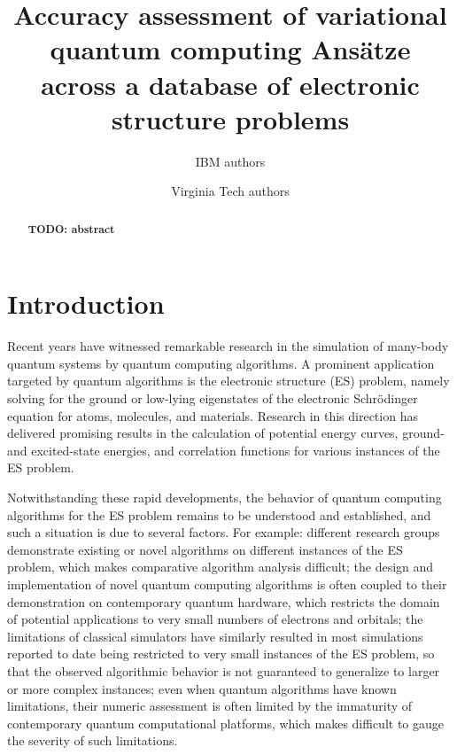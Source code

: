 \documentclass[aps,pra,onecolumn]{revtex4-2}
\newcommand{\todo}[1]{{\bf{{\color{red}TODO: #1}}}}
\begin{document}
\title{Accuracy assessment of variational quantum computing Ans\"{a}tze \\
across a database of electronic structure problems}

\author{IBM authors}
\author{Virginia Tech authors}

\begin{abstract}
\todo{abstract}
\end{abstract}

\maketitle

\section{Introduction}

Recent years have witnessed remarkable research in the simulation of many-body quantum systems  by quantum computing algorithms.
A prominent application targeted by quantum algorithms is the electronic structure (ES) problem, 
namely solving for the ground or low-lying eigenstates of the electronic Schr\"{o}dinger equation for atoms, molecules, and materials.
Research in this direction has delivered promising results in the calculation of potential energy curves,
ground- and excited-state energies, and correlation functions for various instances of the ES problem.

Notwithstanding these rapid developments, the behavior of quantum computing algorithms for the ES problem remains to be understood and established,
and such a situation is due to several factors. For example: 
different research groups demonstrate existing or novel algorithms on different instances of the ES problem, which makes comparative algorithm analysis difficult;
the design and implementation of novel quantum computing algorithms is often coupled to their demonstration on contemporary quantum hardware, which restricts the domain of potential applications to very small numbers of electrons and orbitals;
the limitations of classical simulators have similarly resulted in most simulations reported to date being restricted to very small instances of the ES problem, so that the observed algorithmic behavior is not guaranteed to generalize to larger or more complex instances;
even when quantum algorithms have known limitations, their numeric assessment is often limited by the immaturity of contemporary quantum computational platforms, which makes difficult to gauge the severity of such limitations.
\end{document}
